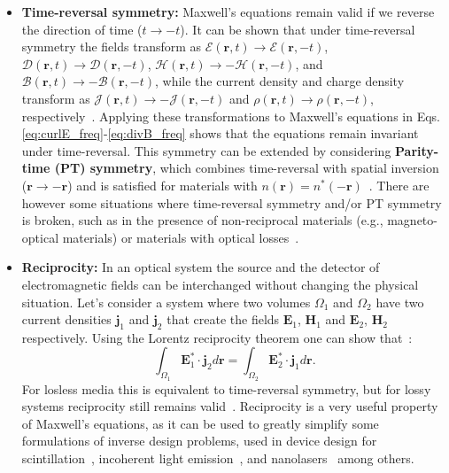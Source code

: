 \begin{itemize}
        \item \textbf{Time-reversal symmetry:} Maxwell's equations remain valid if
              we reverse the direction of time ($t\to-t$). It can be shown that under
              time-reversal symmetry
              the fields transform as
              $\bm{\mathcal{E}}(\mathbf{r}, t)\to\bm{\mathcal{E}}(\mathbf{r}, -t)$,
              $\bm{\mathcal{D}}(\mathbf{r}, t)\to\bm{\mathcal{D}}(\mathbf{r}, -t)$,
              $\bm{\mathcal{H}}(\mathbf{r},
                  t)\to-\bm{\mathcal{H}}(\mathbf{r}, -t)$, and $\bm{\mathcal{B}}(\mathbf{r},
                  t)\to-\bm{\mathcal{B}}(\mathbf{r}, -t)$, while the current density and charge
              density transform as
              $\bm{\mathcal{J}}(\mathbf{r},
                  t)\to-\bm{\mathcal{J}}(\mathbf{r}, -t)$ and $\bm{\mathcal{\rho}}(\mathbf{r},
                  t)\to\bm{\mathcal{\rho}}(\mathbf{r}, -t)$, respectively~\cite{reciprocity}.
              Applying these transformations
              to Maxwell's equations in Eqs. \eqref{eq:curlE_freq}-\eqref{eq:divB_freq} shows
              that the equations remain invariant under time-reversal. This
              symmetry can be extended by
              considering \textbf{Parity-time (PT) symmetry}, which combines time-reversal
              with spatial inversion ($\mathbf{r}\to-\mathbf{r}$) and is satisfied for
              materials with $n(\mathbf{r}) = n^*(-\mathbf{r})$~\cite{pt}. There
              are however some situations where time-reversal symmetry and/or PT symmetry is
              broken,
              such as in the presence of
              non-reciprocal materials (e.g., magneto-optical materials) or materials with
              optical losses~\cite{ownpub0}.

        \item \textbf{Reciprocity:} In an optical system the source and the
              detector of electromagnetic fields can be interchanged without changing the
              physical situation. Let's consider a system where two volumes $\Omega_1$ and
              $\Omega_2$
              have two current densities $\mathbf{j}_1$ and $\mathbf{j}_2$ that create
              the fields $\mathbf{E}_1$, $\mathbf{H}_1$ and $\mathbf{E}_2$, $\mathbf{H}_2$
              respectively. Using the Lorentz reciprocity theorem one can show
              that~\cite{novotny}:
              \begin{equation}
                  \int_{\Omega_1} \mathbf{E}_1^* \cdot \mathbf{j}_2 d\mathbf{r} = \int_{\Omega_2}
                  \mathbf{E}_2^* \cdot \mathbf{j}_1 d\mathbf{r}.
              \end{equation}
              For losless media this is equivalent to time-reversal symmetry, but for
              lossy systems reciprocity still remains valid~\cite{Carminati:98}. Reciprocity
              is a very useful property of Maxwell's equations, as it can be used to
              greatly simplify some formulations of inverse design problems, used in device design for
              scintillation~\cite{Roques_Carmes_2022}, incoherent light emission~\cite{LED_opt, Yao_2022}, and nanolasers~\cite{ownpub4} among others.
    \end{itemize}

